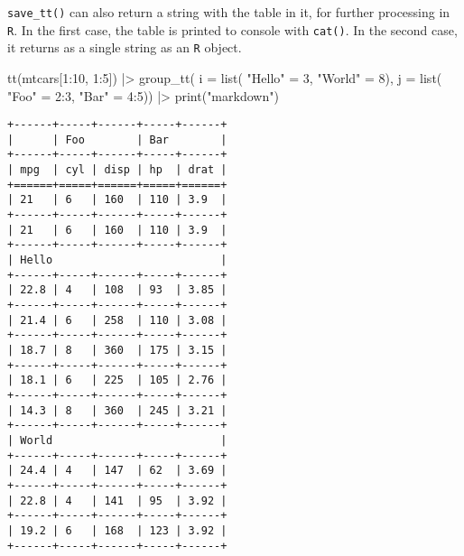\documentclass[
  letterpaper,
  DIV=11,
  numbers=noendperiod]{scrartcl}
\newenvironment{Shaded}{\begin{snugshade}}{\end{snugshade}}
\newcommand{\AttributeTok}[1]{\textcolor[rgb]{0.40,0.45,0.13}{#1}}
\newcommand{\DecValTok}[1]{\textcolor[rgb]{0.68,0.00,0.00}{#1}}
\newcommand{\FunctionTok}[1]{\textcolor[rgb]{0.28,0.35,0.67}{#1}}
\newcommand{\NormalTok}[1]{\textcolor[rgb]{0.00,0.23,0.31}{#1}}
\newcommand{\OtherTok}[1]{\textcolor[rgb]{0.00,0.23,0.31}{#1}}
\newcommand{\SpecialCharTok}[1]{\textcolor[rgb]{0.37,0.37,0.37}{#1}}
\newcommand{\StringTok}[1]{\textcolor[rgb]{0.13,0.47,0.30}{#1}}
\begin{document}
\texttt{save\_tt()} can also return a string with the table in it, for
further processing in \texttt{R}. In the first case, the table is
printed to console with \texttt{cat()}. In the second case, it returns
as a single string as an \texttt{R} object.

\begin{Shaded}
\begin{Highlighting}[]
\FunctionTok{tt}\NormalTok{(mtcars[}\DecValTok{1}\SpecialCharTok{:}\DecValTok{10}\NormalTok{, }\DecValTok{1}\SpecialCharTok{:}\DecValTok{5}\NormalTok{]) }\SpecialCharTok{|\textgreater{}}
  \FunctionTok{group\_tt}\NormalTok{(}
    \AttributeTok{i =} \FunctionTok{list}\NormalTok{(}
      \StringTok{"Hello"} \OtherTok{=} \DecValTok{3}\NormalTok{,}
      \StringTok{"World"} \OtherTok{=} \DecValTok{8}\NormalTok{),}
    \AttributeTok{j =} \FunctionTok{list}\NormalTok{(}
      \StringTok{"Foo"} \OtherTok{=} \DecValTok{2}\SpecialCharTok{:}\DecValTok{3}\NormalTok{,}
      \StringTok{"Bar"} \OtherTok{=} \DecValTok{4}\SpecialCharTok{:}\DecValTok{5}\NormalTok{)) }\SpecialCharTok{|\textgreater{}}
  \FunctionTok{print}\NormalTok{(}\StringTok{"markdown"}\NormalTok{)}
\end{Highlighting}
\end{Shaded}

\begin{verbatim}
+------+-----+------+-----+------+
|      | Foo        | Bar        |
+------+-----+------+-----+------+
| mpg  | cyl | disp | hp  | drat |
+======+=====+======+=====+======+
| 21   | 6   | 160  | 110 | 3.9  |
+------+-----+------+-----+------+
| 21   | 6   | 160  | 110 | 3.9  |
+------+-----+------+-----+------+
| Hello                          |
+------+-----+------+-----+------+
| 22.8 | 4   | 108  | 93  | 3.85 |
+------+-----+------+-----+------+
| 21.4 | 6   | 258  | 110 | 3.08 |
+------+-----+------+-----+------+
| 18.7 | 8   | 360  | 175 | 3.15 |
+------+-----+------+-----+------+
| 18.1 | 6   | 225  | 105 | 2.76 |
+------+-----+------+-----+------+
| 14.3 | 8   | 360  | 245 | 3.21 |
+------+-----+------+-----+------+
| World                          |
+------+-----+------+-----+------+
| 24.4 | 4   | 147  | 62  | 3.69 |
+------+-----+------+-----+------+
| 22.8 | 4   | 141  | 95  | 3.92 |
+------+-----+------+-----+------+
| 19.2 | 6   | 168  | 123 | 3.92 |
+------+-----+------+-----+------+ 
\end{verbatim}
\end{document}
